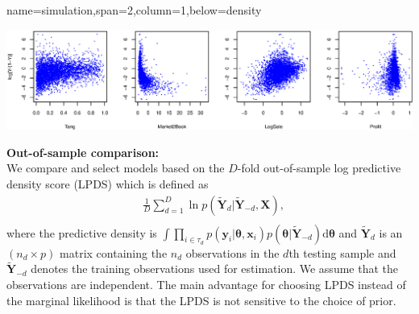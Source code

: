 \documentclass[a0paper,portrait,fontscale = 0.32,margin=1.5em]{baposter/baposter}
\begin{document}
\begin{poster}
{ }

{name=simulation,span=2,column=1,below=density}{
  \begin{center}
    \includegraphics[width=1\textwidth]{Rajanscatter2}\\
  \end{center}

\begin{multicols}{3}

{\color{red} \textbf{Out-of-sample comparison:\\}}
We compare and select models based on the $D$-fold
out-of-sample log predictive density score (LPDS) which is defined as
\[
\begin{split}
&\frac{1}{D}\sum\limits_{d=1}^{D}\ln p(\tilde{\bm{Y}}_{d}|\tilde{\bm{Y}}_{-d},\bm{X}),\\
\end{split}
\]
where the predictive density is $\int\!\prod\nolimits_{i\in\tau_{d}}p(\bm{y}_{i}|\bm{\theta},
\bm{x}_{i})p(\bm{\theta}|\tilde{\bm{Y}}_{-d})\mathrm{d}\bm{\theta}$ and
$\tilde{\bm{Y}}_{d}$ is an $(n_{d}\times p)$ matrix containing the $n_{d}$
observations in the $d$th testing sample and $\tilde{\bm{Y}}_{-d}$ denotes the
training observations used for estimation. We assume that the observations
are independent. The main advantage for choosing LPDS instead of the marginal
likelihood is that the LPDS is not sensitive to the choice of prior.


\end{multicols}}
\end{poster}
\end{document}
